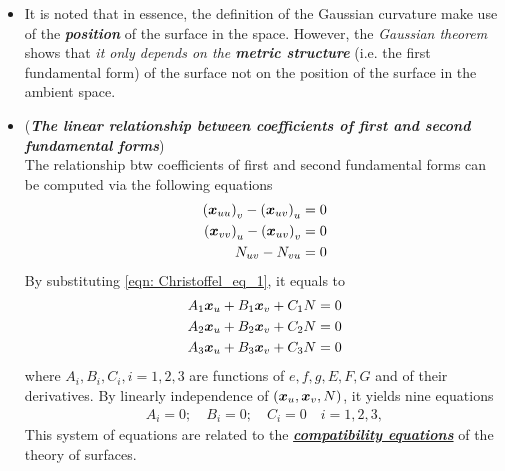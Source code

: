 \documentclass[11pt]{article}
\begin{document}
\begin{itemize}
\item It is noted that in essence, the definition of the Gaussian curvature make use of the \emph{\textbf{position}} of the surface in the space. However, the \emph{Gaussian theorem} shows that \emph{it only depends on the \textbf{metric structure}} (i.e. the first fundamental form) of the surface not on the position of the surface in the ambient space. 

\item (\emph{\textbf{The linear relationship between coefficients of first and second fundamental forms}})\\
The relationship btw coefficients of first and second fundamental forms can be computed via the following equations
\begin{align}
\left(\boldsymbol{x}_{uu}\right)_{v} - \left(\boldsymbol{x}_{uv}\right)_{u} = 0\nonumber\\
\left(\boldsymbol{x}_{vv}\right)_{u} - \left(\boldsymbol{x}_{uv}\right)_{v} = 0\nonumber\\
N_{uv} - N_{vu} = 0\label{eqn: coeff_12_fund_relation_1}
\end{align}
By substituting \eqref{eqn: Christoffel_eq_1}, it equals to 
\begin{align}
A_{1}\boldsymbol{x}_{u} + B_{1}\boldsymbol{x}_{v} + C_{1}N = 0\nonumber\\
A_{2}\boldsymbol{x}_{u} + B_{2}\boldsymbol{x}_{v} + C_{2}N = 0\nonumber\\
A_{3}\boldsymbol{x}_{u} + B_{3}\boldsymbol{x}_{v} + C_{3}N = 0\label{eqn: coeff_12_fund_relation_2} 
\end{align}
where $A_{i}, B_{i}, C_{i}, i=1,2,3$ are functions of $e,f,g,E,F,G$ and of their derivatives. By linearly independence of $(\boldsymbol{x}_{u}, \boldsymbol{x}_{v}, N)$, it yields nine equations
\begin{align}
A_{i} =0; \quad B_{i} = 0; \quad C_{i}=0 \quad i=1,2,3,  \label{eqn: comp_eqn_1}
\end{align} This system of equations are related to the \underline{\emph{\textbf{compatibility equations}}} of the theory of surfaces. 


\end{itemize}
\end{document}
